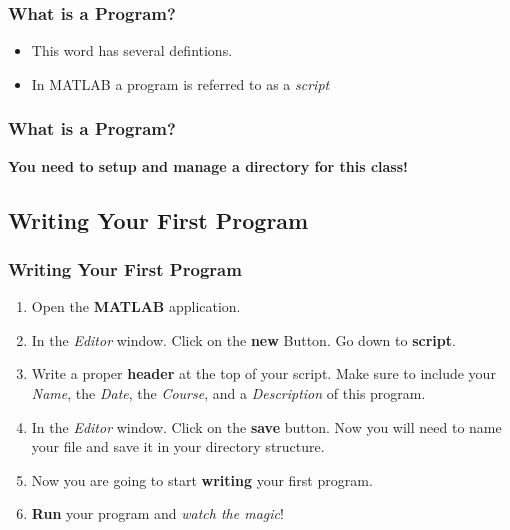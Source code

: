 \documentclass[fleqn]{ltx-talk} %
\newcommand{\sectionIIIsubsectionItitle}{What is a Program?}
\newcommand{\sectionIIIsubsectionIItitle}{Writing Your First Program}
\begin{document}
			\begin{frame}
				\frametitle{\sectionIIIsubsectionItitle}

				\begin{itemize}
					\item This word has several defintions. \\

					\item  In MATLAB a program is referred to as a {\itshape script}	
				\end{itemize}
					
				\btVFill
			\end{frame}

			\begin{frame}
				\frametitle{\sectionIIIsubsectionItitle}
				\bigskip
				\textbf{ You need to setup and manage a directory for this class!}
				
				\btVFill
			\end{frame}

		\subsection{\sectionIIIsubsectionIItitle}\label{sectionIIIsubsectionII}	

			\begin{frame}
				\frametitle{\sectionIIIsubsectionIItitle}

				\begin{enumerate}
					\item Open the {\bfseries  MATLAB} application.
					\item In the {\itshape Editor} window. Click on the {\bfseries  new } Button. Go down to {\bfseries  script}.
					\item Write a proper {\bfseries  header} at the top of your script. Make sure to include your {\itshape Name}, the {\itshape Date}, the {\itshape Course}, and a {\itshape Description} of this program.
					\item In the {\itshape Editor} window. Click on the {\bfseries  save} button. Now you will need to name your file and save it in your directory structure.
					\item Now you are going to start {\bfseries  writing} your first program. 
					\item {\bfseries  Run} your program and {\itshape  watch the magic}!
				\end{enumerate}
				
				\btVFill
			\end{frame}
\end{document}
